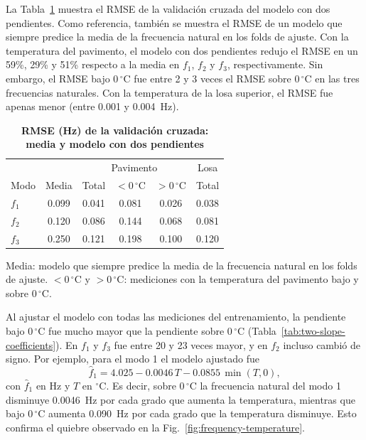 \documentclass[9pt,twocolumn,twoside]{opticajnl}
\begin{document}
La Tabla~\ref{tab:two-slope-rmse} muestra el RMSE de la validación cruzada del modelo con dos pendientes. Como referencia, también se muestra el RMSE de un modelo que siempre predice la media de la frecuencia natural en los folds de ajuste. Con la temperatura del pavimento, el modelo con dos pendientes redujo el RMSE en un 59\%, 29\% y 51\% respecto a la media en $f_1$, $f_2$ y $f_3$, respectivamente. Sin embargo, el RMSE bajo $0\,^\circ$C fue entre 2 y 3 veces el RMSE sobre $0\,^\circ$C en las tres frecuencias naturales. Con la temperatura de la losa superior, el RMSE fue apenas menor (entre 0.001 y 0.004~Hz).

\begin{table}[!htb]
\centering
\caption{\bf RMSE (Hz) de la validación cruzada: media y modelo con dos pendientes}
\small
\setlength{\tabcolsep}{4pt}
\begin{tabular}{lccccc}
\hline
 & & \multicolumn{3}{c}{Pavimento} & Losa \\
Modo & Media & Total & $<0\,^\circ$C & $>0\,^\circ$C & Total \\
\hline
$f_1$ & 0.099 & 0.041 & 0.081 & 0.026 & 0.038 \\
$f_2$ & 0.120 & 0.086 & 0.144 & 0.068 & 0.081 \\
$f_3$ & 0.250 & 0.121 & 0.198 & 0.100 & 0.120 \\
\hline
\end{tabular}
  \label{tab:two-slope-rmse}

\smallskip
\footnotesize
Media: modelo que siempre predice la media de la frecuencia natural en los folds de ajuste. $<0\,^\circ$C y $>0\,^\circ$C: mediciones con la temperatura del pavimento bajo y sobre $0\,^\circ$C.
\end{table}

Al ajustar el modelo con todas las mediciones del entrenamiento, la pendiente bajo $0\,^\circ$C fue mucho mayor que la pendiente sobre $0\,^\circ$C (Tabla~\ref{tab:two-slope-coefficients}). En $f_1$ y $f_3$ fue entre 20 y 23 veces mayor, y en $f_2$ incluso cambió de signo. Por ejemplo, para el modo 1 el modelo ajustado fue
\begin{equation}
\hat{f}_1 = 4.025 - 0.0046\,T - 0.0855\,\min(T,0),
\label{eq:two-slope-f1}
\end{equation}
con $\hat{f}_1$ en Hz y $T$ en $^\circ$C. Es decir, sobre $0\,^\circ$C la frecuencia natural del modo 1 disminuye 0.0046~Hz por cada grado que aumenta la temperatura, mientras que bajo $0\,^\circ$C aumenta 0.090~Hz por cada grado que la temperatura disminuye. Esto confirma el quiebre observado en la Fig.~\ref{fig:frequency-temperature}.
\end{document}
